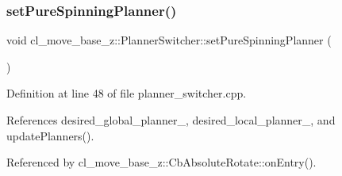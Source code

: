 \subsubsection{\texorpdfstring{set\+Pure\+Spinning\+Planner()}{setPureSpinningPlanner()}}
{\footnotesize\ttfamily void cl\+\_\+move\+\_\+base\+\_\+z\+::\+Planner\+Switcher\+::set\+Pure\+Spinning\+Planner (\begin{DoxyParamCaption}{ }\end{DoxyParamCaption})}



Definition at line 48 of file planner\+\_\+switcher.\+cpp.



References desired\+\_\+global\+\_\+planner\+\_\+, desired\+\_\+local\+\_\+planner\+\_\+, and update\+Planners().



Referenced by cl\+\_\+move\+\_\+base\+\_\+z\+::\+Cb\+Absolute\+Rotate\+::on\+Entry().


